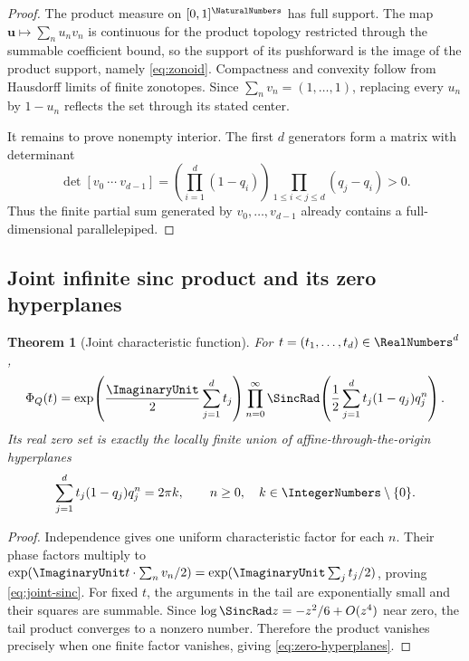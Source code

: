 \documentclass[11pt,a4paper]{article}
\newtheorem{theorem}{Theorem}[section]
\theoremstyle{definition}
\theoremstyle{remark}
\newcommand{\vct}[1]{\boldsymbol{#1}}
\begin{document}
\begin{proof}
The product measure on $[0,1]^{\NaturalNumbers}$ has full support.  The map
$\vct u\mapsto\sum_nu_nv_n$ is continuous for the product topology restricted through the summable coefficient bound, so the support of its pushforward is the image of the product support, namely \eqref{eq:zonoid}.  Compactness and convexity follow from Hausdorff limits of finite zonotopes.  Since $\sum_nv_n=(1,\ldots,1)$, replacing every $u_n$ by $1-u_n$ reflects the set through its stated center.

It remains to prove nonempty interior.  The first $d$ generators form a matrix with determinant
\begin{equation}
  \det[v_0\ \cdots\ v_{d-1}]
  =\left(\prod_{i=1}^d(1-q_i)\right)
    \prod_{1\le i<j\le d}(q_j-q_i)>0.
  \label{eq:first-block-det}
\end{equation}
Thus the finite partial sum generated by $v_0,\ldots,v_{d-1}$ already contains a full-dimensional parallelepiped.
\end{proof}

\subsection{Joint infinite sinc product and its zero hyperplanes}

\begin{theorem}[Joint characteristic function]
\label{thm:joint-char}
For $t=(t_1,\ldots,t_d)\in\RealNumbers^d$,
\begin{equation}
 \Phi_Q(t)
 =\exp\!\left(\frac{\ImaginaryUnit}{2}\sum_{j=1}^dt_j\right)
  \prod_{n=0}^{\infty}
  \SincRad\!\left(\frac12\sum_{j=1}^dt_j(1-q_j)q_j^n\right).
 \label{eq:joint-sinc}
\end{equation}
Its real zero set is exactly the locally finite union of affine-through-the-origin hyperplanes
\begin{equation}
  \sum_{j=1}^dt_j(1-q_j)q_j^n=2\pi k,
  \qquad n\ge0,\quad k\in\IntegerNumbers\setminus\{0\}.
  \label{eq:zero-hyperplanes}
\end{equation}
\end{theorem}

\begin{proof}
Independence gives one uniform characteristic factor for each $n$.  Their phase factors multiply to
$\exp(\ImaginaryUnit t\cdot\sum_nv_n/2)=\exp(\ImaginaryUnit\sum_jt_j/2)$, proving \eqref{eq:joint-sinc}.  For fixed $t$, the arguments in the tail are exponentially small and their squares are summable.  Since $\log\SincRad z=-z^2/6+O(z^4)$ near zero, the tail product converges to a nonzero number.  Therefore the product vanishes precisely when one finite factor vanishes, giving \eqref{eq:zero-hyperplanes}.
\end{proof}
\end{document}
